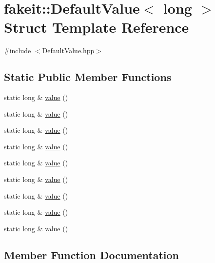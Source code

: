 \hypertarget{structfakeit_1_1DefaultValue_3_01long_01_4}{}\section{fakeit\+::Default\+Value$<$ long $>$ Struct Template Reference}
\label{structfakeit_1_1DefaultValue_3_01long_01_4}


{\ttfamily \#include $<$Default\+Value.\+hpp$>$}

\subsection*{Static Public Member Functions}
\begin{DoxyCompactItemize}
\item 
static long \& \mbox{\hyperlink{structfakeit_1_1DefaultValue_3_01long_01_4_ab454a57efae429dff77d2c75a0d01c3a}{value}} ()
\item 
static long \& \mbox{\hyperlink{structfakeit_1_1DefaultValue_3_01long_01_4_ab454a57efae429dff77d2c75a0d01c3a}{value}} ()
\item 
static long \& \mbox{\hyperlink{structfakeit_1_1DefaultValue_3_01long_01_4_ab454a57efae429dff77d2c75a0d01c3a}{value}} ()
\item 
static long \& \mbox{\hyperlink{structfakeit_1_1DefaultValue_3_01long_01_4_ab454a57efae429dff77d2c75a0d01c3a}{value}} ()
\item 
static long \& \mbox{\hyperlink{structfakeit_1_1DefaultValue_3_01long_01_4_ab454a57efae429dff77d2c75a0d01c3a}{value}} ()
\item 
static long \& \mbox{\hyperlink{structfakeit_1_1DefaultValue_3_01long_01_4_ab454a57efae429dff77d2c75a0d01c3a}{value}} ()
\item 
static long \& \mbox{\hyperlink{structfakeit_1_1DefaultValue_3_01long_01_4_ab454a57efae429dff77d2c75a0d01c3a}{value}} ()
\item 
static long \& \mbox{\hyperlink{structfakeit_1_1DefaultValue_3_01long_01_4_ab454a57efae429dff77d2c75a0d01c3a}{value}} ()
\item 
static long \& \mbox{\hyperlink{structfakeit_1_1DefaultValue_3_01long_01_4_ab454a57efae429dff77d2c75a0d01c3a}{value}} ()
\end{DoxyCompactItemize}


\subsection{Member Function Documentation}
\mbox{\label{structfakeit_1_1DefaultValue_3_01long_01_4_ab454a57efae429dff77d2c75a0d01c3a}} 
